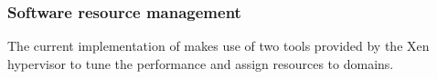 

\subsubsection{Software resource management}
The current implementation of \xempupil makes use of two tools provided by the Xen hypervisor to tune the performance and assign resources to domains.

